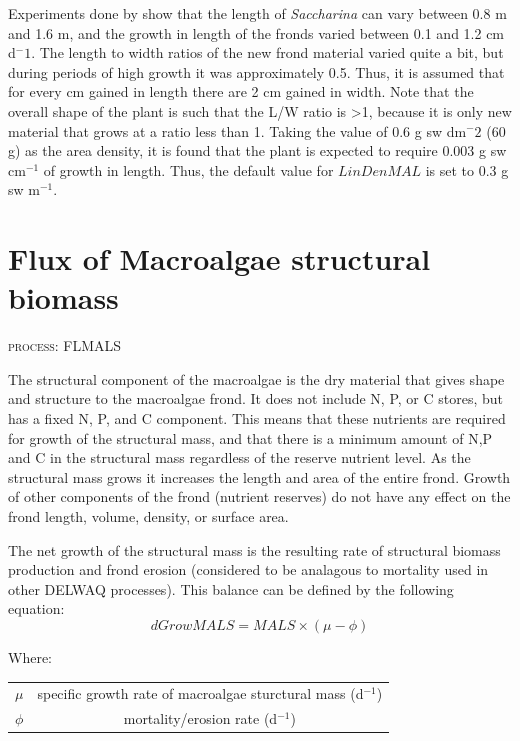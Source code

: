 \documentclass{deltares_manual}
\begin{document}
Experiments done by \cite{sjotun1993} show that the length of \textit{Saccharina} can vary between 0.8 m and 1.6 m, and the growth in length of the fronds varied between 0.1 and 1.2 cm d${^-1}$. The length to width ratios of the new frond material varied quite a bit, but during periods of high growth it was approximately 0.5. Thus, it is assumed that for every cm gained in length there are 2 cm gained in width. Note that the overall shape of the plant is such that the L/W ratio is \textgreater 1, because it is only new material that grows at a ratio less than 1. Taking the \cite{broch2012} value of 0.6 g sw dm${^-2}$ (60 g) as the area density, it is found that the plant is expected to require 0.003 g sw cm$^{-1}$ of growth in length. Thus, the default value for $LinDenMAL$ is set to 0.3 g sw m$^{-1}$.

\pagebreak

\section{Flux of Macroalgae structural biomass}
\begin{flushright}
\textsc{process: FLMALS}
\end{flushright}

The structural component of the macroalgae is the dry material that gives shape and structure to the macroalgae frond. It does not include N, P, or C stores, but has a fixed N, P, and C component. This means that these nutrients are required for growth of the structural mass, and that there is a minimum amount of N,P and C in the structural mass regardless of the reserve nutrient level. As the structural mass grows it increases the length and area of the entire frond. Growth of other components of the frond (nutrient reserves) do not have any effect on the frond length, volume, density, or surface area. 

The net growth of the structural mass is the resulting rate of structural biomass production and frond erosion (considered to be analagous to mortality used in other DELWAQ processes). This balance can be defined by the following equation:
\begin{equation}
	dGrowMALS =MALS \times (\mu - \phi)
\end{equation}

Where:\\
\begin{tabular}{cc}
	$\mu$  & specific growth rate of macroalgae sturctural mass (d$^{-1}$) \\
	$\phi$ & mortality/erosion rate (d$^{-1}$) \\
\end{tabular}
\end{document}
